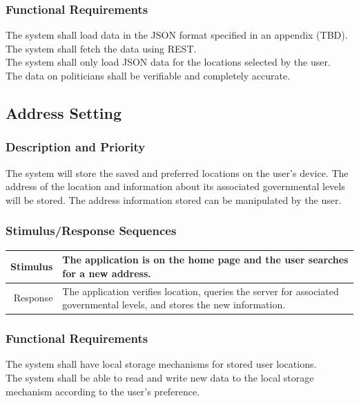 \documentclass[12pt,oneside,letterpaper]{article}
\makeatletter
\newcounter{use_case}
\newcounter{functional_requirement}
\newcounter{tableline}
\newcommand{\functionalrequirementprinter}{\stepcounter{tableline}
\ifthenelse{\value{tableline}>1}{\refstepcounter{functional_requirement}
  FR-\arabic{functional_requirement}}{Requirement ID}
}
\newenvironment{func_req}{
\setcounter{tableline}{0}
\begin{longtabu}{|@{\makebox[8em][r]{\functionalrequirementprinter}}|X|}
  \hline
  Description \\
}{
\end{longtabu}
}
\makeatother
\begin{document}
\subsubsection{Functional Requirements}
\begin{func_req}
  \hline
  The system shall load data in the JSON format specified in an appendix (TBD). \\
  \hline
  The system shall fetch the data using REST. \\
  \hline
  The system shall only load JSON data for the locations
  selected by the user. \\
  \hline
  The data on politicians shall be verifiable and completely accurate.\\
  \hline
\end{func_req}

\subsection{Address Setting}
\subsubsection{Description and Priority}
The system will store the saved and preferred locations on the user's
device. The address of the location and information about its
associated governmental levels will be stored. The address information
stored can be manipulated by the user.
\subsubsection{Stimulus/Response Sequences}
\begin{longtabu}{|r|X|}
  \hline
  Stimulus & The application is on the home page and the user searches for a new address. \\
  \hline
  Response & The application verifies location, queries the server for associated governmental levels, and stores the new information. \\
  \hline
\end{longtabu}
\subsubsection{Functional Requirements}
\begin{func_req}
  \hline
  The system shall have local storage mechanisms for stored user locations. \\
  \hline
  The system shall be able to read and write new data to the local storage mechanism according to the user's preference. \\
  \hline
\end{func_req}
\end{document}

